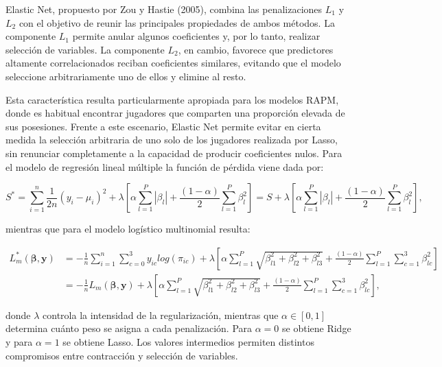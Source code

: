 \documentclass[
  12pt,
]{article}
\begin{document}
Elastic Net, propuesto por Zou y Hastie (2005), combina las
penalizaciones \(L_1\) y \(L_2\) con el objetivo de reunir las
principales propiedades de ambos métodos. La componente \(L_1\) permite
anular algunos coeficientes y, por lo tanto, realizar selección de
variables. La componente \(L_2\), en cambio, favorece que predictores
altamente correlacionados reciban coeficientes similares, evitando que
el modelo seleccione arbitrariamente uno de ellos y elimine al resto.

Esta característica resulta particularmente apropiada para los modelos
RAPM, donde es habitual encontrar jugadores que comparten una proporción
elevada de sus posesiones. Frente a este escenario, Elastic Net permite
evitar en cierta medida la selección arbitraria de uno solo de los
jugadores realizada por Lasso, sin renunciar completamente a la
capacidad de producir coeficientes nulos. Para el modelo de regresión
lineal múltiple la función de pérdida viene dada por:

\begin{equation}
S^*= \sum_{i=1}^n \frac{1}{2n} (y_i-\mu_i)^2 + \lambda [\alpha\sum_{l=1}^P|\beta_l|+\frac{(1-\alpha)}{2}\sum_{l=1}^P \beta_l^2]=S+\lambda[\alpha\sum_{l=1}^P |\beta_l|+\frac{(1-\alpha)}{2}\sum_{l=1}^P \beta_l^2],
\end{equation}

mientras que para el modelo logístico multinomial resulta:

\begin{equation}
\begin{split}
L^*_m(\boldsymbol{\beta},\boldsymbol{y}) &= -\frac{1}{n}\sum_{i=1}^n\sum_{c=0}^3y_{ic}log(\pi_{ic}) + \lambda \left[ \alpha\sum_{l=1}^P\sqrt{\beta_{l1}^2+\beta_{l2}^2+\beta_{l3}^2}+\frac{(1-\alpha)}{2}\sum_{l=1}^P\sum_{c=1}^3 \beta_{lc}^2 \right] \\
&= - \frac{1}{n}L_m(\boldsymbol{\beta},\boldsymbol{y}) + \lambda \left[ \alpha\sum_{l=1}^P\sqrt{\beta_{l1}^2+\beta_{l2}^2+\beta_{l3}^2}+\frac{(1-\alpha)}{2}\sum_{l=1}^P\sum_{c=1}^3 \beta_{lc}^2 \right],
\end{split}
\end{equation}

donde \(\lambda\) controla la intensidad de la regularización, mientras
que \(\alpha \in [0,1]\) determina cuánto peso se asigna a cada
penalización. Para \(\alpha=0\) se obtiene Ridge y para \(\alpha=1\) se
obtiene Lasso. Los valores intermedios permiten distintos compromisos
entre contracción y selección de variables.
\end{document}

